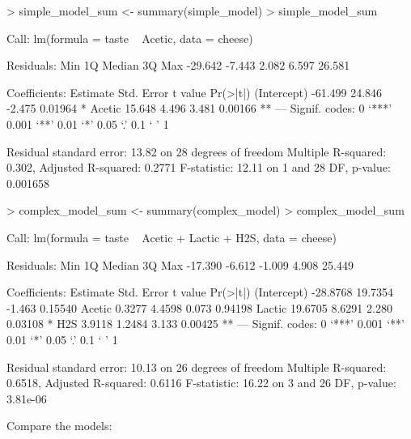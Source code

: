 \documentclass[a4paper]{article}
\begin{document}
\begin{Schunk}
\begin{Sinput}
> simple_model_sum <- summary(simple_model)
> simple_model_sum
\end{Sinput}
\begin{Soutput}
Call:
lm(formula = taste ~ Acetic, data = cheese)

Residuals:
    Min      1Q  Median      3Q     Max 
-29.642  -7.443   2.082   6.597  26.581 

Coefficients:
            Estimate Std. Error t value Pr(>|t|)   
(Intercept)  -61.499     24.846  -2.475  0.01964 * 
Acetic        15.648      4.496   3.481  0.00166 **
---
Signif. codes:  0 ‘***’ 0.001 ‘**’ 0.01 ‘*’ 0.05 ‘.’ 0.1 ‘ ’ 1

Residual standard error: 13.82 on 28 degrees of freedom
Multiple R-squared:  0.302,	Adjusted R-squared:  0.2771 
F-statistic: 12.11 on 1 and 28 DF,  p-value: 0.001658
\end{Soutput}
\begin{Sinput}
> complex_model_sum <- summary(complex_model)
> complex_model_sum
\end{Sinput}
\begin{Soutput}
Call:
lm(formula = taste ~ Acetic + Lactic + H2S, data = cheese)

Residuals:
    Min      1Q  Median      3Q     Max 
-17.390  -6.612  -1.009   4.908  25.449 

Coefficients:
            Estimate Std. Error t value Pr(>|t|)   
(Intercept) -28.8768    19.7354  -1.463  0.15540   
Acetic        0.3277     4.4598   0.073  0.94198   
Lactic       19.6705     8.6291   2.280  0.03108 * 
H2S           3.9118     1.2484   3.133  0.00425 **
---
Signif. codes:  0 ‘***’ 0.001 ‘**’ 0.01 ‘*’ 0.05 ‘.’ 0.1 ‘ ’ 1

Residual standard error: 10.13 on 26 degrees of freedom
Multiple R-squared:  0.6518,	Adjusted R-squared:  0.6116 
F-statistic: 16.22 on 3 and 26 DF,  p-value: 3.81e-06
\end{Soutput}
\end{Schunk}
Compare the models:
\end{document}
